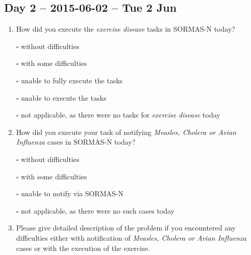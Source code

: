 \documentclass[a4paper, titlepage]{tufte-handout}
\begin{document}
\newpage
\subsection{Day 2 -- 2015-06-02 -- Tue  2 Jun}
\label{sec-8-2}
\begin{enumerate}
\item How did you execute the \emph{exercise disease} tasks in SORMAS-N today?

\quad $\square$ without difficulties

\quad $\square$ with some difficulties

\quad $\square$ unable to fully execute the tasks

\quad $\square$ unable to execute the tasks

\quad $\square$ not applicable, as there were no tasks for \emph{exercise disease} today

\item How did you execute your task of notifying \emph{Measles, Cholera or Avian Influenza} cases in SORMAS-N today?

\quad $\square$ without difficulties

\quad $\square$ with some difficulties

\quad $\square$ unable to notify via SORMAS-N

\quad $\square$ not applicable, as there were no such cases today

\item Please give detailed description of the problem if you encountered any difficulties either with notification of \emph{Measles, Cholera or Avian Influenza} cases or with the execution of the exercise.

\hrulefill

\hrulefill

\hrulefill

\hrulefill

\hrulefill

\hrulefill

\hrulefill

\hrulefill

\hrulefill

\hrulefill
\end{enumerate}

\newpage
\end{document}
